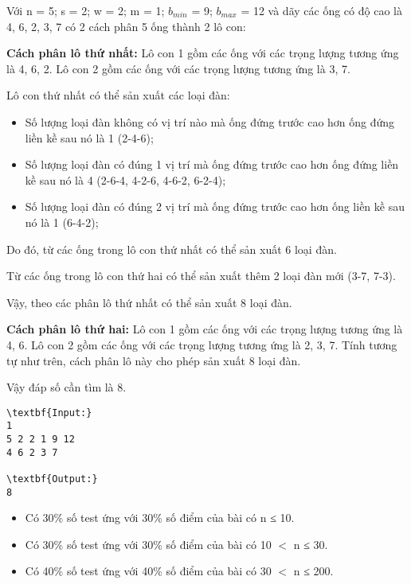 Với n = 5; s = 2; w = 2; m = 1; $b_{min}$ = 9; $b_{max}$ = 12 và dãy các ống có độ cao là 4, 6, 2, 3, 7 có 2 cách phân 5 ống thành 2 lô con:

\textbf{Cách phân lô thứ nhất: } Lô con 1 gồm các ống với các trọng lượng tương ứng là 4, 6, 2. Lô con 2 gồm các ống với các trọng lượng tương ứng là 3, 7.

Lô con thứ nhất có thể sản xuất các loại đàn:
\begin{itemize}
	\item Số lượng loại đàn không có vị trí nào mà ống đứng trước cao hơn ống đứng liền kề sau nó là 1 (2-4-6);
	\item Số lượng loại đàn có đúng 1 vị trí mà ống đứng trước cao hơn ống đứng liền kề sau nó là 4 (2-6-4, 4-2-6, 4-6-2, 6-2-4);
	\item Số lượng loại đàn có đúng 2 vị trí mà ống đứng trước cao hơn ống liền kề sau nó là 1 (6-4-2);
\end{itemize}

Do đó, từ các ống trong lô con thứ nhất có thể sản xuất 6 loại đàn.


Từ các ống trong lô con thứ hai có thể sản xuất thêm 2 loại đàn mới (3-7, 7-3).


Vậy, theo các phân lô thứ nhất có thể sản xuất 8 loại đàn.

\textbf{Cách phân lô thứ hai: } Lô con 1 gồm các ống với các trọng lượng tương ứng là 4, 6. Lô con 2 gồm các ống với các trọng lượng tương ứng là 2, 3, 7. Tính tương tự như trên, cách phân lô này cho phép sản xuất 8 loại đàn.

Vậy đáp số cần tìm là 8.
\begin{verbatim}
\textbf{Input:}
1
5 2 2 1 9 12
4 6 2 3 7

\textbf{Output:}
8\end{verbatim}
\begin{itemize}
	\item Có 30\% số test ứng với 30\% số điểm của bài có n ≤ 10.
	\item Có 30\% số test ứng với 30\% số điểm của bài có 10 $<$ n ≤ 30.
	\item Có 40\% số test ứng với 40\% số điểm của bài có 30 $<$ n ≤ 200.
\end{itemize}